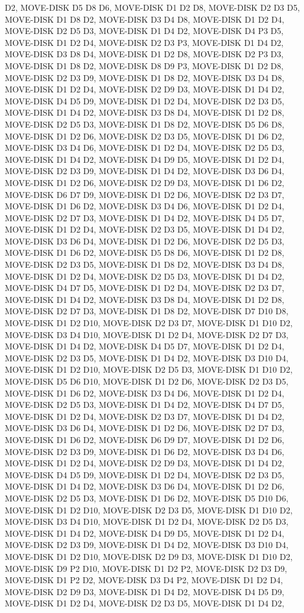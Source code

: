 \documentclass[12pt]{article}
\begin{document}
\begin{appendix}
\begin{itemize}
D2,  MOVE-DISK D5 D8 D6,  MOVE-DISK D1 D2 D8,  MOVE-DISK D2 D3 D5,  MOVE-DISK D1 D8 D2,  MOVE-DISK D3 D4 D8,  MOVE-DISK D1 D2 D4,  MOVE-DISK D2 D5 D3,  MOVE-DISK D1 D4 D2,  MOVE-DISK D4 P3 D5,  MOVE-DISK D1 D2 D4,  MOVE-DISK D2 D3 P3,  MOVE-DISK D1 D4 D2,  MOVE-DISK D3 D8 D4,  MOVE-DISK D1 D2 D8,  MOVE-DISK D2 P3 D3,  MOVE-DISK D1 D8 D2,  MOVE-DISK D8 D9 P3,  MOVE-DISK D1 D2 D8,  MOVE-DISK D2 D3 D9,  MOVE-DISK D1 D8 D2,  MOVE-DISK D3 D4 D8,  MOVE-DISK D1 D2 D4,  MOVE-DISK D2 D9 D3,  MOVE-DISK D1 D4 D2,  MOVE-DISK D4 D5 D9,  MOVE-DISK D1 D2 D4,  MOVE-DISK D2 D3 D5,  MOVE-DISK D1 D4 D2,  MOVE-DISK D3 D8 D4,  MOVE-DISK D1 D2 D8,  MOVE-DISK D2 D5 D3,  MOVE-DISK D1 D8 D2,  MOVE-DISK D5 D6 D8,  MOVE-DISK D1 D2 D6,  MOVE-DISK D2 D3 D5,  MOVE-DISK D1 D6 D2,  MOVE-DISK D3 D4 D6,  MOVE-DISK D1 D2 D4,  MOVE-DISK D2 D5 D3,  MOVE-DISK D1 D4 D2,  MOVE-DISK D4 D9 D5,  MOVE-DISK D1 D2 D4,  MOVE-DISK D2 D3 D9,  MOVE-DISK D1 D4 D2,  MOVE-DISK D3 D6 D4,  MOVE-DISK D1 D2 D6,  MOVE-DISK D2 D9 D3,  MOVE-DISK D1 D6 D2,  MOVE-DISK D6 D7 D9,  MOVE-DISK D1 D2 D6,  MOVE-DISK D2 D3 D7,  MOVE-DISK D1 D6 D2,  MOVE-DISK D3 D4 D6,  MOVE-DISK D1 D2 D4,  MOVE-DISK D2 D7 D3,  MOVE-DISK D1 D4 D2,  MOVE-DISK D4 D5 D7,  MOVE-DISK D1 D2 D4,  MOVE-DISK D2 D3 D5,  MOVE-DISK D1 D4 D2,  MOVE-DISK D3 D6 D4,  MOVE-DISK D1 D2 D6,  MOVE-DISK D2 D5 D3,  MOVE-DISK D1 D6 D2,  MOVE-DISK D5 D8 D6,  MOVE-DISK D1 D2 D8,  MOVE-DISK D2 D3 D5,  MOVE-DISK D1 D8 D2,  MOVE-DISK D3 D4 D8,  MOVE-DISK D1 D2 D4,  MOVE-DISK D2 D5 D3,  MOVE-DISK D1 D4 D2,  MOVE-DISK D4 D7 D5,  MOVE-DISK D1 D2 D4,  MOVE-DISK D2 D3 D7,  MOVE-DISK D1 D4 D2,  MOVE-DISK D3 D8 D4,  MOVE-DISK D1 D2 D8,  MOVE-DISK D2 D7 D3,  MOVE-DISK D1 D8 D2,  MOVE-DISK D7 D10 D8,  MOVE-DISK D1 D2 D10,  MOVE-DISK D2 D3 D7,  MOVE-DISK D1 D10 D2,  MOVE-DISK D3 D4 D10,  MOVE-DISK D1 D2 D4,  MOVE-DISK D2 D7 D3,  MOVE-DISK D1 D4 D2,  MOVE-DISK D4 D5 D7,  MOVE-DISK D1 D2 D4,  MOVE-DISK D2 D3 D5,  MOVE-DISK D1 D4 D2,  MOVE-DISK D3 D10 D4,  MOVE-DISK D1 D2 D10,  MOVE-DISK D2 D5 D3,  MOVE-DISK D1 D10 D2,  MOVE-DISK D5 D6 D10,  MOVE-DISK D1 D2 D6,  MOVE-DISK D2 D3 D5,  MOVE-DISK D1 D6 D2,  MOVE-DISK D3 D4 D6,  MOVE-DISK D1 D2 D4,  MOVE-DISK D2 D5 D3,  MOVE-DISK D1 D4 D2,  MOVE-DISK D4 D7 D5,  MOVE-DISK D1 D2 D4,  MOVE-DISK D2 D3 D7,  MOVE-DISK D1 D4 D2,  MOVE-DISK D3 D6 D4,  MOVE-DISK D1 D2 D6,  MOVE-DISK D2 D7 D3,  MOVE-DISK D1 D6 D2,  MOVE-DISK D6 D9 D7,  MOVE-DISK D1 D2 D6,  MOVE-DISK D2 D3 D9,  MOVE-DISK D1 D6 D2,  MOVE-DISK D3 D4 D6,  MOVE-DISK D1 D2 D4,  MOVE-DISK D2 D9 D3,  MOVE-DISK D1 D4 D2,  MOVE-DISK D4 D5 D9,  MOVE-DISK D1 D2 D4,  MOVE-DISK D2 D3 D5,  MOVE-DISK D1 D4 D2,  MOVE-DISK D3 D6 D4,  MOVE-DISK D1 D2 D6,  MOVE-DISK D2 D5 D3,  MOVE-DISK D1 D6 D2,  MOVE-DISK D5 D10 D6,  MOVE-DISK D1 D2 D10,  MOVE-DISK D2 D3 D5,  MOVE-DISK D1 D10 D2,  MOVE-DISK D3 D4 D10,  MOVE-DISK D1 D2 D4,  MOVE-DISK D2 D5 D3,  MOVE-DISK D1 D4 D2,  MOVE-DISK D4 D9 D5,  MOVE-DISK D1 D2 D4,  MOVE-DISK D2 D3 D9,  MOVE-DISK D1 D4 D2,  MOVE-DISK D3 D10 D4,  MOVE-DISK D1 D2 D10,  MOVE-DISK D2 D9 D3,  MOVE-DISK D1 D10 D2,  MOVE-DISK D9 P2 D10,  MOVE-DISK D1 D2 P2,  MOVE-DISK D2 D3 D9,  MOVE-DISK D1 P2 D2,  MOVE-DISK D3 D4 P2,  MOVE-DISK D1 D2 D4,  MOVE-DISK D2 D9 D3,  MOVE-DISK D1 D4 D2,  MOVE-DISK D4 D5 D9,  MOVE-DISK D1 D2 D4,  MOVE-DISK D2 D3 D5,  MOVE-DISK D1 D4 D2,  
\end{itemize}
\end{appendix}
\end{document}
